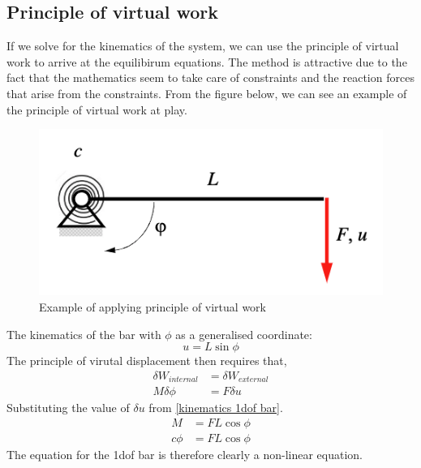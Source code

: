 \subsection{Principle of virtual work} 
If we solve for the kinematics of the system, we can use the principle of virtual work to arrive at the equilibirum equations. The method is attractive due to the fact that the mathematics seem to take care of constraints and the reaction forces that arise from the constraints. From the figure below, we can see an example of the principle of virtual work at play. 
\begin{figure}[H]
	\centering 
	\includegraphics[scale = 0.6]{Lecture 1_nlm/images/virtual disp}
	\caption{Example of applying principle of virtual work}
	\label{egs virtual work}
\end{figure}
The kinematics of the bar with $\phi$ as a generalised coordinate: 
\begin{equation}
	u = L\sin \phi
	\label{kinematics 1dof bar}
\end{equation}
The principle of virutal displacement then requires that, 
\begin{align}
	\delta W_{internal} &= \delta W_{external}\\
	M\delta \phi &= F \delta u
\end{align}
Substituting the value of $\delta u$ from \autoref{kinematics 1dof bar}. 
\begin{align}
	M &= FL\cos \phi\\
	c \phi &= FL\cos \phi
\end{align}
The equation for the 1dof bar is therefore clearly a non-linear equation. 
























